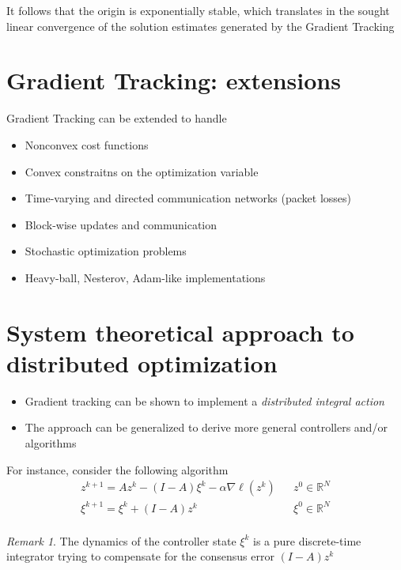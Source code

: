 \documentclass{book}
\newcommand{\R}{\mathbb{R}}
\newcommand{\fatl}{\boldsymbol{\ell}}
\theoremstyle{theoremv2}
\theoremstyle{defv2}
\theoremstyle{remark}
\newtheorem*{remark}{Remark}
\theoremstyle{remark}
\theoremstyle{definition}
\theoremstyle{definition}
\begin{document}
It follows that the origin is exponentially stable, which translates in the sought linear convergence of the solution estimates generated by the Gradient Tracking

\section{Gradient Tracking: extensions}
Gradient Tracking can be extended to handle 
\begin{itemize}
    \item Nonconvex cost functions
    \item Convex constraitns on the optimization variable
    \item Time-varying and directed communication networks (packet losses)
    \item Block-wise updates and communication
    \item Stochastic optimization problems
    \item Heavy-ball, Nesterov, Adam-like implementations
\end{itemize}

\section{System theoretical approach to distributed optimization}
\begin{itemize}
    \item Gradient tracking can be shown to implement a \emph{distributed integral action}
        \item The approach can be generalized to derive more general controllers and/or algorithms
\end{itemize}
For instance, consider the following algorithm
\begin{align*}
    z^{k+1} = Az^k - (I-A)\xi^k - \alpha\nabla\fatl(z^k) && z^0 \in\R^N\\
    \xi^{k+1} = \xi^k + (I-A)z^k && \xi^0 \in\R^N\\
\end{align*}
\begin{remark}
    The dynamics of the controller state $\xi^k$ is a pure discrete-time integrator trying to compensate for the consensus error $(I-A)z^k$
\end{remark}
\end{document}
